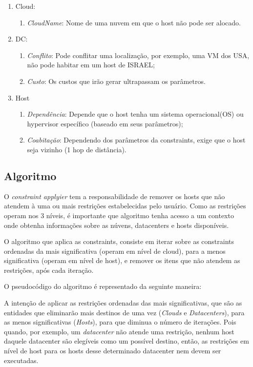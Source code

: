 \begin{enumerate}
  \item Cloud:
  \begin{enumerate}
    \item \textit{CloudName}: Nome de uma nuvem em que o host não pode ser alocado.
  \end{enumerate}

  \item DC:
  \begin{enumerate}
    \item \textit{Conflito}: Pode conflitar uma localização, por exemplo, uma VM dos USA, não pode habitar em um host de ISRAEL;
    \item \textit{Custo}: Os custos que irão gerar ultrapassam os parâmetros.
  \end{enumerate}

 \item Host
  \begin{enumerate}
    \item \textit{Dependência}: Depende que o host tenha um sistema operacional(OS) ou hypervisor específico (baseado em seus parâmetros);
    \item \textit{Coabitação}: Dependendo dos parâmetros da constraints, exige que o host seja vizinho (1 hop de distância).
  \end{enumerate}
  
\end{enumerate}

\subsection{Algoritmo}
O \textit{constraint applyier} tem a responsabilidade de remover os hosts que não atendem à
uma ou mais restrições estabelecidas pelo usuário. Como as restrições operam nos 3 níveis,
é importante que algoritmo tenha acesso a um contexto onde obtenha informações sobre as núvens, 
datacenters e hosts disponíveis.

O algoritmo que aplica as constraints, consiste em iterar sobre as constraints ordenadas da mais significativa 
(operam em nível de cloud), para a menos significativa (operam em nível de host), e remover os itens que não atendem as
restrições, após cada iteração.

O pseudocódigo do algoritmo é representado da seguinte maneira:



A intenção de aplicar as restrições ordenadas das mais significativas, que são as 
entidades que eliminarão mais destinos de uma vez (\textit{Clouds} e \textit{Datacenters}),
para as menos significativas (\textit{Hosts}), para que diminua o número de iterações.
Pois quando, por exemplo, um \textit{datacenter} não atende uma restrição, nenhum host daquele datacenter 
são elegíveis como um possível destino, então, as restrições em nível de host para
os hosts desse determinado datacenter nem devem ser executadas. 

